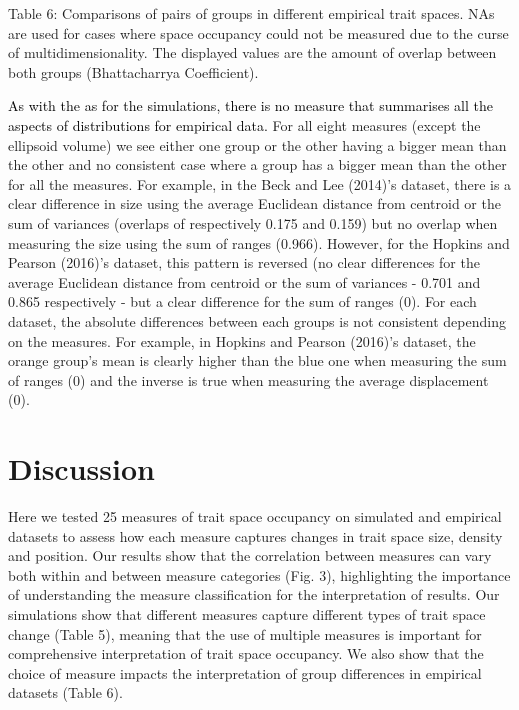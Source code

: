 \documentclass[]{article}
\begin{document}
Table 6: Comparisons of pairs of groups in different empirical trait
spaces. NAs are used for cases where space occupancy could not be
measured due to the curse of multidimensionality. The displayed values
are the amount of overlap between both groups (Bhattacharrya
Coefficient).

\renewcommand\baselinestretch{1.6}\selectfont


\textcolor{black}{As with the as for the simulations,
there is no measure that summarises all the aspects of distributions for
empirical data.} For all eight measures (except the ellipsoid volume)
we see either one group or the other having a bigger mean than the other
and no consistent case where a group has a bigger mean than the other
for all the measures. For example, in the Beck and Lee (2014)'s dataset,
there is a clear difference in size using the average Euclidean distance
from centroid or the sum of variances (overlaps of respectively 0.175
and 0.159) but no overlap when measuring the size using the sum of
ranges (0.966). However, for the Hopkins and Pearson (2016)'s dataset,
this pattern is reversed (no clear differences for the average Euclidean
distance from centroid or the sum of variances - 0.701 and 0.865
respectively - but a clear difference for the sum of ranges (0). For
each dataset, the absolute differences between each groups is not
consistent depending on the measures. For example, in Hopkins and
Pearson (2016)'s dataset, the orange group's mean is clearly higher than
the blue one when measuring the sum of ranges (0) and the inverse is
true when measuring the average displacement (0).

\section{Discussion}\label{discussion}

Here we tested 25 measures of trait space occupancy on simulated and
empirical datasets to assess how each measure captures changes in trait
space size, density and position. Our results show that the correlation
between measures can vary both within and between measure categories
(Fig. 3), highlighting the importance of understanding the measure
classification for the interpretation of results. Our simulations show
that different measures capture different types of trait space change
(Table 5), meaning that the use of multiple measures is important for
comprehensive interpretation of trait space occupancy. We also show that
the choice of measure impacts the interpretation of group differences in
empirical datasets (Table 6).
\end{document}
